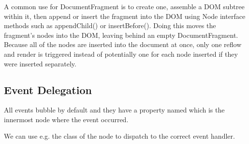 A common use for DocumentFragment is to create one, assemble a DOM subtree
within it, then append or insert the fragment into the DOM using Node
interface methods such as appendChild() or insertBefore(). Doing this moves
the fragment's nodes into the DOM, leaving behind an empty
DocumentFragment. Because all of the nodes are inserted into the document at
once, only one reflow and render is triggered instead of potentially one for
each node inserted if they were inserted separately.


\subsection{Event Delegation}

All events bubble by default and they have a property named 
which is the innermost node where the event occurred.

We can use e.g. the class  of the node to dispatch to the correct
event handler.



